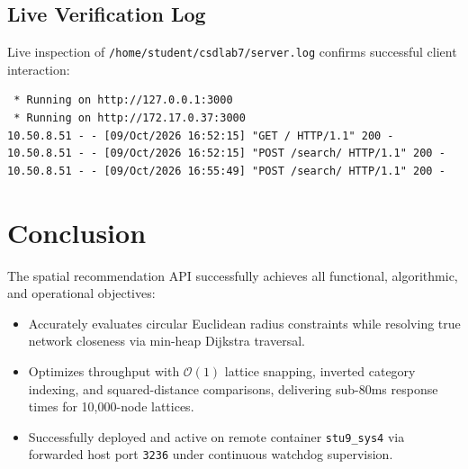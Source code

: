 \documentclass[11pt,a4paper]{article}
\begin{document}
\subsection{Live Verification Log}
Live inspection of \texttt{/home/student/csdlab7/server.log} confirms successful client interaction:
\begin{lstlisting}
 * Running on http://127.0.0.1:3000
 * Running on http://172.17.0.37:3000
10.50.8.51 - - [09/Oct/2026 16:52:15] "GET / HTTP/1.1" 200 -
10.50.8.51 - - [09/Oct/2026 16:52:15] "POST /search/ HTTP/1.1" 200 -
10.50.8.51 - - [09/Oct/2026 16:55:49] "POST /search/ HTTP/1.1" 200 -
\end{lstlisting}

\section{Conclusion}
The spatial recommendation API successfully achieves all functional, algorithmic, and operational objectives:
\begin{itemize}
    \item Accurately evaluates circular Euclidean radius constraints while resolving true network closeness via min-heap Dijkstra traversal.
    \item Optimizes throughput with $\mathcal{O}(1)$ lattice snapping, inverted category indexing, and squared-distance comparisons, delivering sub-80ms response times for 10,000-node lattices.
    \item Successfully deployed and active on remote container \texttt{stu9\_sys4} via forwarded host port \texttt{3236} under continuous watchdog supervision.
\end{itemize}
\end{document}
